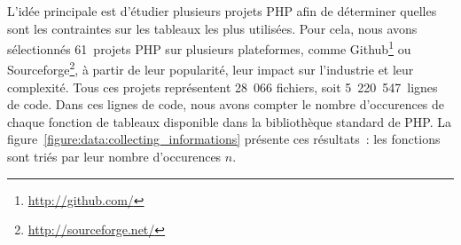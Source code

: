 L'idée principale est d'étudier plusieurs projets PHP afin de déterminer quelles
sont les contraintes sur les tableaux les plus utilisées. Pour cela, nous avons
sélectionnés 61~projets PHP sur plusieurs plateformes, comme
Github\footnote{\url{http://github.com/}} ou
Sourceforge\footnote{\url{http://sourceforge.net/}}, à partir de leur
popularité, leur impact sur l'industrie et leur complexité. Tous ces projets
représentent 28~066 fichiers, soit 5~220~547~lignes de code. Dans ces lignes de
code, nous avons compter le nombre d'occurences de chaque fonction de tableaux
disponible dans la bibliothèque standard de PHP. La
figure~\ref{figure:data:collecting_informations} présente ces résultats~: les
fonctions sont triés par leur nombre d'occurences $n$.
%
\begin{figure}

{
\Huge

}
\end{figure}
